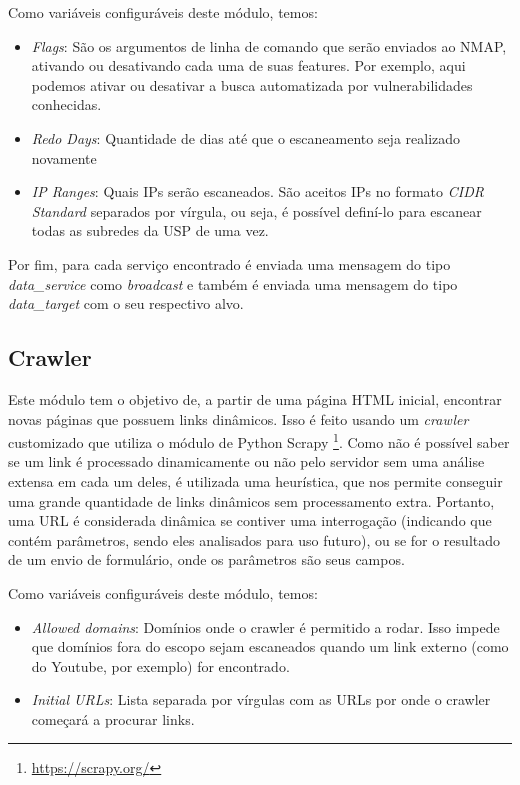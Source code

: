     Como variáveis configuráveis deste módulo, temos:
    \begin{itemize}
        \item \emph{Flags}: São os argumentos de linha de comando que serão enviados ao NMAP, ativando ou desativando cada uma de suas features. Por exemplo, aqui podemos ativar ou desativar a busca automatizada por vulnerabilidades conhecidas.
        \item \emph{Redo Days}: Quantidade de dias até que o escaneamento seja realizado novamente
        \item \emph{IP Ranges}: Quais IPs serão escaneados. São aceitos IPs no formato \textit{CIDR Standard} separados por vírgula, ou seja, é possível definí-lo para escanear todas as subredes da USP de uma vez.
    \end{itemize}
    
    Por fim, para cada serviço encontrado é enviada uma mensagem do tipo \textit{data\_service} como \textit{broadcast} e também é enviada uma mensagem do tipo \textit{data\_target} com o seu respectivo alvo.
    
    \subsection{Crawler}
    Este módulo tem o objetivo de, a partir de uma página HTML inicial, encontrar novas páginas que possuem links dinâmicos. Isso é feito usando um \textit{crawler} customizado que utiliza o módulo de Python Scrapy \footnote{\url{https://scrapy.org/}}. Como não é possível saber se um link é processado dinamicamente ou não pelo servidor sem uma análise extensa em cada um deles, é utilizada uma heurística, que nos permite conseguir uma grande quantidade de links dinâmicos sem processamento extra. Portanto, uma URL é considerada dinâmica se contiver uma interrogação (indicando que contém parâmetros, sendo eles analisados para uso futuro), ou se for o resultado de um envio de formulário, onde os parâmetros são seus campos. 
    
    Como variáveis configuráveis deste módulo, temos:
    \begin{itemize}
        \item \emph{Allowed domains}: Domínios onde o crawler é permitido a rodar. Isso impede que domínios fora do escopo sejam escaneados quando um link externo (como do Youtube, por exemplo) for encontrado.
        \item \emph{Initial URLs}: Lista separada por vírgulas com as URLs por onde o crawler começará a procurar links. 
    \end{itemize}
    
